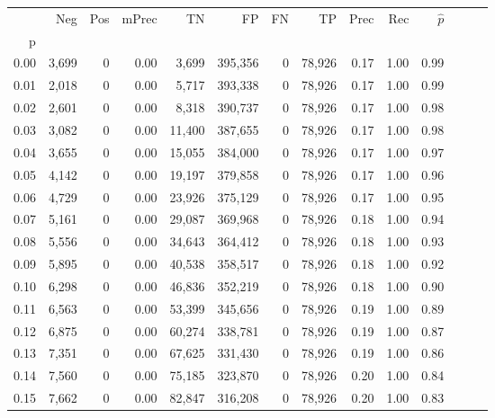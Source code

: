 \begin{tabular}{rrrrrrrrrrrrrr}
\toprule
{} &    Neg &    Pos & mPrec &       TN &       FP &      FN &      TP &  Prec &   Rec & $\hat{p}$ \\
p    &        &        &       &          &          &         &         &       &       &           \\
\midrule
0.00 &  3,699 &      0 &  0.00 &    3,699 &  395,356 &       0 &  78,926 &  0.17 &  1.00 &      0.99 \\
0.01 &  2,018 &      0 &  0.00 &    5,717 &  393,338 &       0 &  78,926 &  0.17 &  1.00 &      0.99 \\
0.02 &  2,601 &      0 &  0.00 &    8,318 &  390,737 &       0 &  78,926 &  0.17 &  1.00 &      0.98 \\
0.03 &  3,082 &      0 &  0.00 &   11,400 &  387,655 &       0 &  78,926 &  0.17 &  1.00 &      0.98 \\
0.04 &  3,655 &      0 &  0.00 &   15,055 &  384,000 &       0 &  78,926 &  0.17 &  1.00 &      0.97 \\
0.05 &  4,142 &      0 &  0.00 &   19,197 &  379,858 &       0 &  78,926 &  0.17 &  1.00 &      0.96 \\
0.06 &  4,729 &      0 &  0.00 &   23,926 &  375,129 &       0 &  78,926 &  0.17 &  1.00 &      0.95 \\
0.07 &  5,161 &      0 &  0.00 &   29,087 &  369,968 &       0 &  78,926 &  0.18 &  1.00 &      0.94 \\
0.08 &  5,556 &      0 &  0.00 &   34,643 &  364,412 &       0 &  78,926 &  0.18 &  1.00 &      0.93 \\
0.09 &  5,895 &      0 &  0.00 &   40,538 &  358,517 &       0 &  78,926 &  0.18 &  1.00 &      0.92 \\
0.10 &  6,298 &      0 &  0.00 &   46,836 &  352,219 &       0 &  78,926 &  0.18 &  1.00 &      0.90 \\
0.11 &  6,563 &      0 &  0.00 &   53,399 &  345,656 &       0 &  78,926 &  0.19 &  1.00 &      0.89 \\
0.12 &  6,875 &      0 &  0.00 &   60,274 &  338,781 &       0 &  78,926 &  0.19 &  1.00 &      0.87 \\
0.13 &  7,351 &      0 &  0.00 &   67,625 &  331,430 &       0 &  78,926 &  0.19 &  1.00 &      0.86 \\
0.14 &  7,560 &      0 &  0.00 &   75,185 &  323,870 &       0 &  78,926 &  0.20 &  1.00 &      0.84 \\
0.15 &  7,662 &      0 &  0.00 &   82,847 &  316,208 &       0 &  78,926 &  0.20 &  1.00 &      0.83 \\

\end{tabular}
